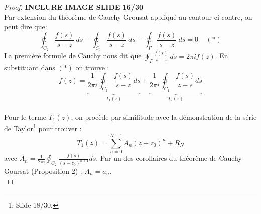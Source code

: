 	
	\begin{proof}
	\textbf{INCLURE IMAGE SLIDE 16/30}\\
	Par extension du théorème de Cauchy-Grousat appliqué au contour ci-contre, on peut dire que:
	\begin{equation}
	\oint_{C_2} \frac{f(s)}{s-z}\ ds -	\oint_{C_1} \frac{f(s)}{s-z}\ ds -\oint_{\Gamma}
	 \frac{f(s)}{s-z}\ ds = 0\ \ \ \ \ (*)
	\end{equation}
	La première formule de Cauchy nous dit que $\oint_\Gamma \frac{f(s)}{s-z}\ ds = 2\pi i f(z)$.
	En substituant dans $(*)$ on trouve :
	\begin{equation}
	f(z) = \underbrace{\dfrac{1}{2\pi i}\oint_{C_2} \frac{f(s)}{s-z}ds}_{T_1(z)} + \underbrace{
	\dfrac{1}{2\pi i}\oint_{C_1} \frac{f(s)}{z-s}ds}_{T_2(z)}
	\end{equation}\ \\
	
	Pour le terme $T_1(z)$, on procède par similitude avec la démonstration de la série de 
	Taylor\footnote{Slide 18/30.} pour trouver :
	\begin{equation}
	T_1(z) = \sum_{n=0}^{N-1} A_n(z-z_0)^n + R_N
	\end{equation}
	avec $A_n = \frac{1}{2\pi i}\oint_{C_2} \frac{f(s)}{(s-z_0)^{n+1}}ds$. Par un des 
	corollaires du théorème de Cauchy-Goursat (Proposition 2) : $A_n = a_n$.\\
	

\end{proof}
